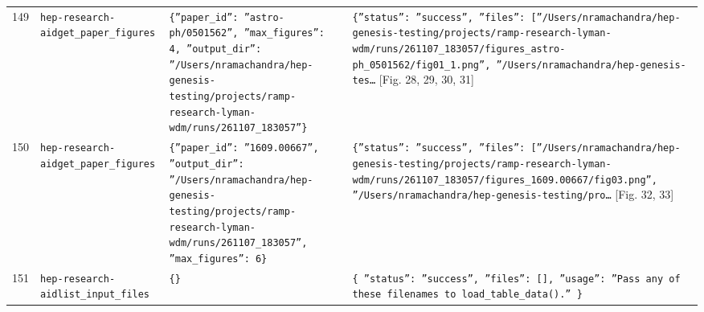 \documentclass[11pt,a4paper]{article}
\begin{document}
\begin{longtable}{@{}p{}p{}p{}p{}@{}}
149 & \texttt{hep-research-aid}\newline\texttt{get\_\allowbreak{}paper\_\allowbreak{}figures} & \texttt{\{''paper\_\allowbreak{}id'':\allowbreak{} ''astro-ph/\allowbreak{}0501562'',\allowbreak{} ''max\_\allowbreak{}figures'':\allowbreak{} 4,\allowbreak{} ''output\_\allowbreak{}dir'':\allowbreak{} ''/\allowbreak{}Users/\allowbreak{}nramachandra/\allowbreak{}hep-genesis-testing/\allowbreak{}projects/\allowbreak{}ramp-research-lyman-wdm/\allowbreak{}runs/\allowbreak{}261107\_\allowbreak{}183057''\}\allowbreak{}} & \texttt{\{''status'':\allowbreak{} ''success'',\allowbreak{} ''files'':\allowbreak{} [''/\allowbreak{}Users/\allowbreak{}nramachandra/\allowbreak{}hep-genesis-testing/\allowbreak{}projects/\allowbreak{}ramp-research-lyman-wdm/\allowbreak{}runs/\allowbreak{}261107\_\allowbreak{}183057/\allowbreak{}figures\_\allowbreak{}astro-ph\_\allowbreak{}0501562/\allowbreak{}fig01\_\allowbreak{}1.png'',\allowbreak{} ''/\allowbreak{}Users/\allowbreak{}nramachandra/\allowbreak{}hep-genesis-tes\ldots{}\allowbreak{}} [Fig. 28, 29, 30, 31] \\
150 & \texttt{hep-research-aid}\newline\texttt{get\_\allowbreak{}paper\_\allowbreak{}figures} & \texttt{\{''paper\_\allowbreak{}id'':\allowbreak{} ''1609.00667'',\allowbreak{} ''output\_\allowbreak{}dir'':\allowbreak{} ''/\allowbreak{}Users/\allowbreak{}nramachandra/\allowbreak{}hep-genesis-testing/\allowbreak{}projects/\allowbreak{}ramp-research-lyman-wdm/\allowbreak{}runs/\allowbreak{}261107\_\allowbreak{}183057'',\allowbreak{} ''max\_\allowbreak{}figures'':\allowbreak{} 6\}\allowbreak{}} & \texttt{\{''status'':\allowbreak{} ''success'',\allowbreak{} ''files'':\allowbreak{} [''/\allowbreak{}Users/\allowbreak{}nramachandra/\allowbreak{}hep-genesis-testing/\allowbreak{}projects/\allowbreak{}ramp-research-lyman-wdm/\allowbreak{}runs/\allowbreak{}261107\_\allowbreak{}183057/\allowbreak{}figures\_\allowbreak{}1609.00667/\allowbreak{}fig03.png'',\allowbreak{} ''/\allowbreak{}Users/\allowbreak{}nramachandra/\allowbreak{}hep-genesis-testing/\allowbreak{}pro\ldots{}\allowbreak{}} [Fig. 32, 33] \\
151 & \texttt{hep-research-aid}\newline\texttt{list\_\allowbreak{}input\_\allowbreak{}files} & \texttt{\{\}\allowbreak{}} & \texttt{\{   ''status'':\allowbreak{} ''success'',\allowbreak{}   ''files'':\allowbreak{} []\allowbreak{},\allowbreak{}   ''usage'':\allowbreak{} ''Pass any of these filenames to load\_\allowbreak{}table\_\allowbreak{}data()\allowbreak{}.'' \}\allowbreak{}} \\

\end{longtable}
\end{document}
